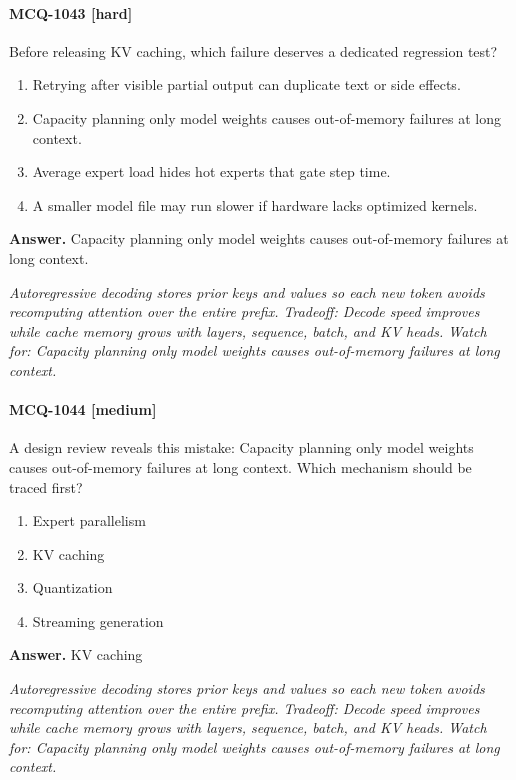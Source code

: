 \paragraph{MCQ-1043 [hard]} Before releasing KV caching, which failure deserves a dedicated regression test?
\begin{enumerate}[label=\Alph*.]
\item Retrying after visible partial output can duplicate text or side effects.
\item Capacity planning only model weights causes out-of-memory failures at long context.
\item Average expert load hides hot experts that gate step time.
\item A smaller model file may run slower if hardware lacks optimized kernels.
\end{enumerate}
\noindent\textbf{Answer.} Capacity planning only model weights causes out-of-memory failures at long context.
\par\textit{Autoregressive decoding stores prior keys and values so each new token avoids recomputing attention over the entire prefix. Tradeoff: Decode speed improves while cache memory grows with layers, sequence, batch, and KV heads. Watch for: Capacity planning only model weights causes out-of-memory failures at long context.}
\paragraph{MCQ-1044 [medium]} A design review reveals this mistake: Capacity planning only model weights causes out-of-memory failures at long context. Which mechanism should be traced first?
\begin{enumerate}[label=\Alph*.]
\item Expert parallelism
\item KV caching
\item Quantization
\item Streaming generation
\end{enumerate}
\noindent\textbf{Answer.} KV caching
\par\textit{Autoregressive decoding stores prior keys and values so each new token avoids recomputing attention over the entire prefix. Tradeoff: Decode speed improves while cache memory grows with layers, sequence, batch, and KV heads. Watch for: Capacity planning only model weights causes out-of-memory failures at long context.}
